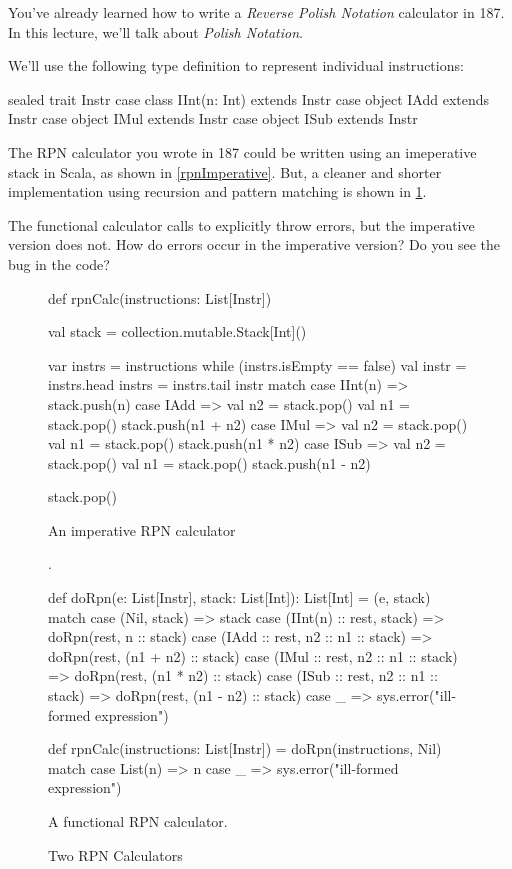\documentclass{book}
\begin{document}
You've already learned how to write a \emph{Reverse Polish Notation} calculator
in 187. In this lecture, we'll talk about \emph{Polish Notation}.

We'll use the following type definition to represent individual instructions:
%
\begin{scalacode}
sealed trait Instr
case class IInt(n: Int) extends Instr
case object IAdd extends Instr
case object IMul extends Instr
case object ISub extends Instr
\end{scalacode}


The RPN calculator you wrote in 187 could be written using an imeperative stack
in Scala, as shown in \cref{rpnImperative}. But, a cleaner and shorter
implementation using recursion and pattern matching is shown in \cref{rpnCalc}.

\begin{think}
The functional calculator calls  to explicitly throw
errors, but the imperative version does not. How do errors occur in the
imperative version? Do you see the bug in the code?
\end{think}

\begin{figure}
\begin{minipage}{0.45\textwidth}
\begin{scalacode}
def rpnCalc(instructions: List[Instr]) {
  val stack = collection.mutable.Stack[Int]()

  var instrs = instructions
  while (instrs.isEmpty == false) {
    val instr = instrs.head
    instrs = instrs.tail
    instr match {
      case IInt(n) => stack.push(n)
      case IAdd => {
        val n2 = stack.pop()
        val n1 = stack.pop()
        stack.push(n1 + n2)
      }
      case IMul => {
        val n2 = stack.pop()
        val n1 = stack.pop()
        stack.push(n1 * n2)
      }
      case ISub => {
        val n2 = stack.pop()
        val n1 = stack.pop()
        stack.push(n1 - n2)
      }
    }
  }

  stack.pop()
}
\end{scalacode}
\caption{An imperative RPN calculator}.
\end{minipage}
\quad
\vrule
\quad
\begin{minipage}{0.45\textwidth}
\begin{scalacode}
def doRpn(e: List[Instr], stack: List[Int]): List[Int] =
  (e, stack) match {
    case (Nil, stack) => stack
    case (IInt(n) :: rest, stack) => doRpn(rest, n :: stack)
    case (IAdd :: rest, n2 :: n1 :: stack) =>
      doRpn(rest, (n1 + n2) :: stack)
    case (IMul :: rest, n2 :: n1 :: stack) =>
      doRpn(rest, (n1 * n2) :: stack)
    case (ISub :: rest, n2 :: n1 :: stack) =>
      doRpn(rest, (n1 - n2) :: stack)
    case _ => sys.error("ill-formed expression")
  }

def rpnCalc(instructions: List[Instr]) =
  doRpn(instructions, Nil) match {
    case List(n) => n
    case _ => sys.error("ill-formed expression")
  }
\end{scalacode}
\caption{A functional RPN calculator.}
\label{rpnCalc}
\end{minipage}
\caption{Two RPN Calculators}
\end{figure}
\end{document}

